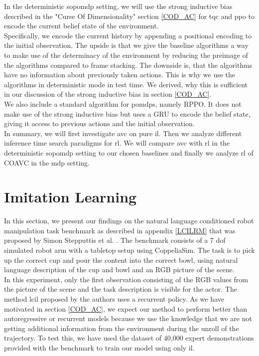 In the deterministic \ac{sopomdp} setting, we will use the strong inductive bias described in the "Curse Of Dimensionality" 
section \ref{COD_AC} for \ac{tqc} and \ac{ppo} to encode the current belief state of the environment. \\

Specifically, we encode the current history by appending a positional encoding to the initial observation. The upside is that we give 
the baseline algorithms a way to make use of the determinacy of the environment by reducing the preimage of the algorithms compared to 
frame stacking. The downside is, that the algorithms have no information about previously taken actions. This is why we use the 
algorithms in deterministic mode in test time. We derived, why this is sufficient in our discussion of the strong inductive bias in 
section \ref{COD_AC}.\\

We also include a standard algorithm for \ac{pomdp}s, namely RPPO. It does not make use of the strong inductive bias but uses a GRU 
to encode the belief state, giving it access to previous actions and the initial observation.\\


In summary, we will first investigate \ac{avc} on pure \ac{il}. Then we analyze different inference time search 
paradigms for \ac{rl}. We will compare \ac{avc} with \ac{rl} in the deterministic \ac{sopomdp} setting to our chosen baselines and finally we analyze 
\ac{rl} of COAVC in the \ac{mdp} setting.


\section{Imitation Learning}
\label{sec:exp_imi_lr}
In this section, we present our findings on the natural language conditioned robot manipulation task benchmark as described in appendix \ref{LCILRM} that was proposed by 
Simon Stepputtis et al. \cite{stepputtis2020languageconditioned}. The benchmark consists of a 7 dof simulated robot arm with a 
tabletop setup using CoppeliaSim. The task is to pick 
up the correct cup and pour the content into the correct bowl, using natural language description of the cup and bowl and an RGB 
picture of the scene.\\

In this experiment, only the first observation consisting of the RGB values from the picture of the 
scene and the task description is visible for the actor. The method \ac{lcil} 
proposed by the authors uses a recurrent policy. As we have motivated in section \ref{COD_AC}, we expect our method to perform better than autoregressive or recurrent 
models because we use the knowledge that we are not getting additional information from the environment during the unroll of the trajectory. 
To test this, we have used the dataset of 40,000 expert demonstrations provided with the benchmark to train our model using only \ac{il}.\\

